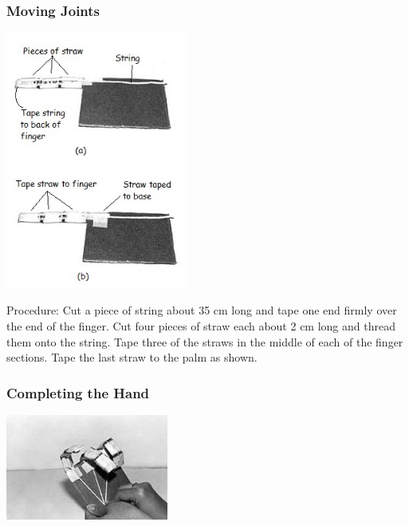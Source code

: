 \begin{multicols}{2}
\subsubsection{Moving Joints}

\begin{center}
\includegraphics[width=0.45\textwidth]{./img/robotic-hand-4.jpg}
\end{center}

\begin{description*}
\item[Procedure:]{Cut a piece of string about 35 cm long and tape one end firmly over the end of
the finger. Cut four pieces of straw each about 2 cm long and thread them onto the string. Tape three of the straws in the middle of each of the finger sections. Tape the last straw to the palm as shown. }
\end{description*}

\subsubsection{Completing the Hand}

\begin{center}
\includegraphics[width=0.4\textwidth]{./img/robotic-hand-final.jpg}
\end{center}


\end{multicols}
